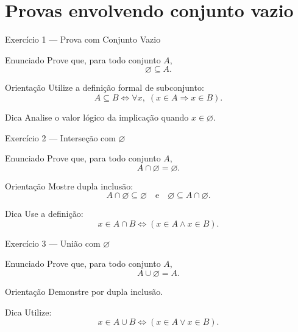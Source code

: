 \documentclass[9pt]{beamer}
\begin{document}
\section{Provas envolvendo conjunto vazio}

\begin{frame}{Exercício 1 — Prova com Conjunto Vazio}

\begin{block}{Enunciado}
Prove que, para todo conjunto $A$,
\[
\varnothing \subseteq A.
\]
\end{block}

\begin{block}{Orientação}
Utilize a definição formal de subconjunto:
\[
A \subseteq B 
\Longleftrightarrow 
\forall x,\; (x \in A \Rightarrow x \in B).
\]
\end{block}

\begin{block}{Dica}
Analise o valor lógico da implicação quando
$x \in \varnothing$.
\end{block}

\end{frame}
\begin{frame}{Exercício 2 — Interseção com $\varnothing$}

\begin{block}{Enunciado}
Prove que, para todo conjunto $A$,
\[
A \cap \varnothing = \varnothing.
\]
\end{block}

\begin{block}{Orientação}
Mostre dupla inclusão:
\[
A \cap \varnothing \subseteq \varnothing
\quad \text{e} \quad
\varnothing \subseteq A \cap \varnothing.
\]
\end{block}

\begin{block}{Dica}
Use a definição:
\[
x \in A \cap B \Longleftrightarrow (x \in A \land x \in B).
\]
\end{block}

\end{frame}
\begin{frame}{Exercício 3 — União com $\varnothing$}

\begin{block}{Enunciado}
Prove que, para todo conjunto $A$,
\[
A \cup \varnothing = A.
\]
\end{block}

\begin{block}{Orientação}
Demonstre por dupla inclusão.
\end{block}

\begin{block}{Dica}
Utilize:
\[
x \in A \cup B 
\Longleftrightarrow 
(x \in A \lor x \in B).
\]
\end{block}

\end{frame}
\end{document}
